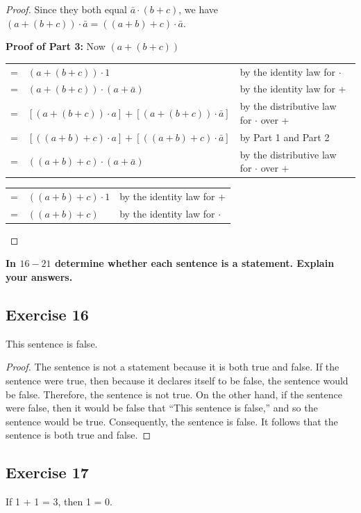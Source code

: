 \documentclass[14pt]{extarticle}
\newcommand{\cy}{\color{cyan}}
\begin{document}
\begin{proof}
Since they both equal \(\bar{a} \cdot (b + c)\), we have \((a + (b + c)) \cdot \bar{a} = ((a + b) + c) \cdot \bar{a}\).

{\bf Proof of Part 3:} Now \((a + (b + c))\)

\begin{center}
\begin{tabular}{cll}
= & \((a + (b + c)) \cdot 1\) & {\cy by the identity law for $\cdot$} \\
= & \((a + (b + c)) \cdot (a + \bar{a})\) & {\cy by the identity law for +} \\
= & \([(a + (b + c)) \cdot a] + [(a + (b + c)) \cdot \bar{a}]\) & {\cy by the distributive law for $\cdot$ over +} \\
= & \([((a + b) + c) \cdot a] + [((a + b) + c) \cdot \bar{a}]\) & {\cy by Part 1 and Part 2} \\
= & \(((a + b) + c) \cdot (a + \bar{a})\) & {\cy by the distributive law for $\cdot$ over +}
\end{tabular}
\end{center}
\begin{center}
\begin{tabular}{cll}
= & \(((a + b) + c) \cdot 1\) & {\cy by the identity law for +} \\
= & \(((a + b) + c)\) & {\cy by the identity law for $\cdot$}
\end{tabular}
\end{center}

\end{proof}

{\bf \cy In $16-21$ determine whether each sentence is a statement. Explain your answers.}

\subsection{Exercise 16}
This sentence is false.

\begin{proof}
The sentence is not a statement because it is both true and false. If the sentence were true, then because it declares 
itself to be false, the sentence would be false. Therefore, the sentence is not true. On the other hand, if the 
sentence were false, then it would be false that “This sentence is false,” and so the sentence would be true. 
Consequently, the sentence is false. It follows that the sentence is both true and false.
\end{proof}

\subsection{Exercise 17}
If 1 + 1 = 3, then 1 = 0.
\end{document}
